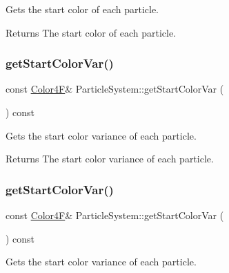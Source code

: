 Gets the start color of each particle.

\begin{DoxyReturn}{Returns}
The start color of each particle. 
\end{DoxyReturn}
\mbox{\label{classParticleSystem_a30038c34a4837c9aabd204971d8be99a}} 
\subsubsection{\texorpdfstring{get\+Start\+Color\+Var()}{getStartColorVar()}\hspace{0.1cm}{\footnotesize\ttfamily [1/2]}}
{\footnotesize\ttfamily const \hyperlink{structColor4F}{Color4F}\& Particle\+System\+::get\+Start\+Color\+Var (\begin{DoxyParamCaption}{ }\end{DoxyParamCaption}) const\hspace{0.3cm}{\ttfamily [inline]}}

Gets the start color variance of each particle.

\begin{DoxyReturn}{Returns}
The start color variance of each particle. 
\end{DoxyReturn}
\mbox{\label{classParticleSystem_a30038c34a4837c9aabd204971d8be99a}} 
\subsubsection{\texorpdfstring{get\+Start\+Color\+Var()}{getStartColorVar()}\hspace{0.1cm}{\footnotesize\ttfamily [2/2]}}
{\footnotesize\ttfamily const \hyperlink{structColor4F}{Color4F}\& Particle\+System\+::get\+Start\+Color\+Var (\begin{DoxyParamCaption}{ }\end{DoxyParamCaption}) const\hspace{0.3cm}{\ttfamily [inline]}}

Gets the start color variance of each particle.

